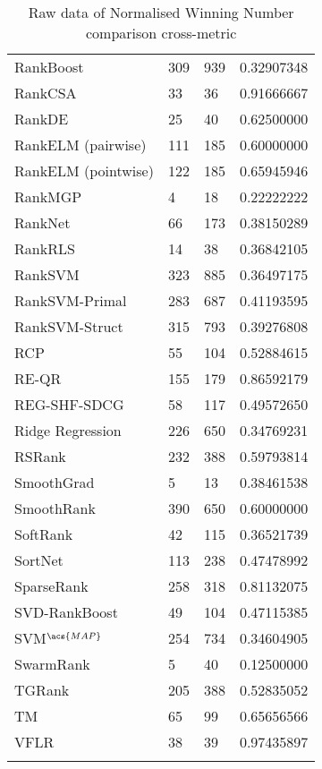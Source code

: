 \begin{longtable}{l|l|l|l}
RankBoost & 309 & 939 & 0.32907348 \\ 
RankCSA & 33 & 36 & 0.91666667 \\ 
RankDE & 25 & 40 & 0.62500000 \\ 
RankELM (pairwise) & 111 & 185 & 0.60000000 \\ 
RankELM (pointwise) & 122 & 185 & 0.65945946 \\ 
RankMGP & 4 & 18 & 0.22222222 \\ 
RankNet & 66 & 173 & 0.38150289 \\ 
Rank\acs{RLS} & 14 & 38 & 0.36842105 \\ 
Rank\acs{SVM} & 323 & 885 & 0.36497175 \\ 
Rank\acs{SVM}-Primal & 283 & 687 & 0.41193595 \\ 
Rank\acs{SVM}-Struct & 315 & 793 & 0.39276808 \\ 
RCP & 55 & 104 & 0.52884615 \\ 
RE-QR & 155 & 179 & 0.86592179 \\ 
REG-SHF-SDCG & 58 & 117 & 0.49572650 \\ 
Ridge Regression & 226 & 650 & 0.34769231 \\ 
RSRank & 232 & 388 & 0.59793814 \\ 
SmoothGrad & 5 & 13 & 0.38461538 \\ 
SmoothRank & 390 & 650 & 0.60000000 \\ 
SoftRank & 42 & 115 & 0.36521739 \\ 
SortNet & 113 & 238 & 0.47478992 \\ 
SparseRank & 258 & 318 & 0.81132075 \\ 
\acs{SVD}-RankBoost & 49 & 104 & 0.47115385 \\ 
\acs{SVM}$^{\acs{MAP}}$ & 254 & 734 & 0.34604905 \\ 
SwarmRank & 5 & 40 & 0.12500000 \\ 
TGRank & 205 & 388 & 0.52835052 \\ 
TM & 65 & 99 & 0.65656566 \\ 
VFLR & 38 & 39 & 0.97435897 \\
\caption{Raw data of Normalised Winning Number comparison cross-metric}
\label{tab:raw_data_norm_winnum_all}
\end{longtable}
